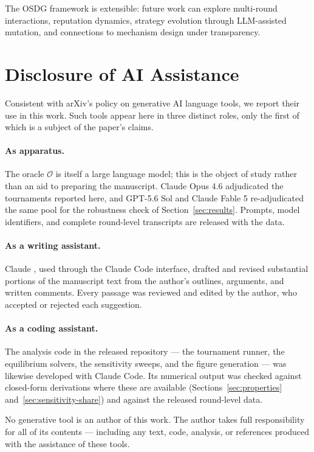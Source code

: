 \documentclass[11pt]{article}
\begin{document}
The OSDG framework is extensible: future work can explore
multi-round interactions, reputation dynamics, strategy evolution
through LLM-assisted mutation, and connections to mechanism design
under transparency.


\section*{Disclosure of AI Assistance}

Consistent with arXiv's policy on generative AI language tools, we
report their use in this work.
Such tools appear here in three distinct roles, only the first of
which is a subject of the paper's claims.

\paragraph{As apparatus.}
The oracle $\mathcal{O}$ is itself a large language model; this is
the object of study rather than an aid to preparing the manuscript.
Claude Opus 4.6 adjudicated the tournaments reported here, and
GPT-5.6 Sol and Claude Fable 5 re-adjudicated the same pool for the
robustness check of Section~\ref{sec:results}.
Prompts, model identifiers, and complete round-level transcripts are
released with the data.

\paragraph{As a writing assistant.}
Claude \citep{anthropic2025claude}, used through the Claude Code
interface, drafted and revised substantial portions of the
manuscript text from the author's outlines, arguments, and written
comments.
Every passage was reviewed and edited by the author, who accepted or
rejected each suggestion.

\paragraph{As a coding assistant.}
The analysis code in the released repository --- the tournament
runner, the equilibrium solvers, the sensitivity sweeps, and the
figure generation --- was likewise developed with Claude Code.
Its numerical output was checked against closed-form derivations
where these are available
(Sections~\ref{sec:properties} and~\ref{sec:sensitivity-share}) and
against the released round-level data.

No generative tool is an author of this work.
The author takes full responsibility for all of its contents ---
including any text, code, analysis, or references produced with the
assistance of these tools.





\end{document}
